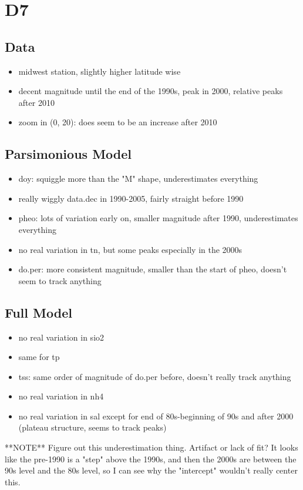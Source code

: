 \documentclass[12pt]{amsart}
\begin{document}
\section{D7}
\subsection{Data}
\begin{itemize}
\item midwest station, slightly higher latitude wise
\item decent magnitude until the end of the 1990s, peak in 2000, relative peaks after 2010
\item zoom in (0, 20): does seem to be an increase after 2010
\end{itemize}
\subsection{Parsimonious Model}
\begin{itemize}
\item doy: squiggle more than the "M" shape, underestimates everything
\item really wiggly data.dec in 1990-2005, fairly straight before 1990
\item pheo: lots of variation early on, smaller magnitude after 1990, underestimates everything
\item no real variation in tn, but some peaks especially in the 2000s
\item  do.per: more consistent magnitude, smaller than the start of pheo, doesn't seem to track anything
\end{itemize}
\subsection{Full Model}
\begin{itemize}
\item no real variation in sio2
\item same for tp
\item tss: same order of magnitude of do.per before, doesn't really track anything
\item no real variation in nh4
\item no real variation in sal except for end of 80s-beginning of 90s and after 2000 (plateau structure, seems to track peaks)
\end{itemize}
**NOTE** Figure out this underestimation thing. Artifact or lack of fit?
It looks like the pre-1990 is a "step" above the 1990s, and then the 2000s are between the 90s level and the 80s level, so I can see why the "intercept" wouldn't really center this.
\end{document}
